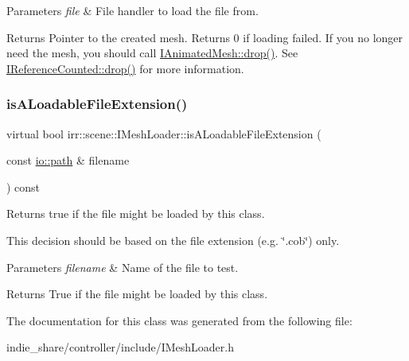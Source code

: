 \begin{DoxyParams}{Parameters}
{\em file} & File handler to load the file from. \\
\hline
\end{DoxyParams}
\begin{DoxyReturn}{Returns}
Pointer to the created mesh. Returns 0 if loading failed. If you no longer need the mesh, you should call \hyperlink{classirr_1_1IReferenceCounted_a03856a09355b89d178090c4a5f738543}{I\+Animated\+Mesh\+::drop()}. See \hyperlink{classirr_1_1IReferenceCounted_a03856a09355b89d178090c4a5f738543}{I\+Reference\+Counted\+::drop()} for more information. 
\end{DoxyReturn}
\mbox{\label{classirr_1_1scene_1_1IMeshLoader_a64bd3f1f17b4ff1f0f4f929c850614f3}} 
\subsubsection{\texorpdfstring{is\+A\+Loadable\+File\+Extension()}{isALoadableFileExtension()}}
{\footnotesize\ttfamily virtual bool irr\+::scene\+::\+I\+Mesh\+Loader\+::is\+A\+Loadable\+File\+Extension (\begin{DoxyParamCaption}\item[{const \hyperlink{namespaceirr_1_1io_ab1bdc45edb3f94d8319c02bc0f840ee1}{io\+::path} \&}]{filename }\end{DoxyParamCaption}) const\hspace{0.3cm}{\ttfamily [pure virtual]}}



Returns true if the file might be loaded by this class. 

This decision should be based on the file extension (e.\+g. \char`\"{}.\+cob\char`\"{}) only. 
\begin{DoxyParams}{Parameters}
{\em filename} & Name of the file to test. \\
\hline
\end{DoxyParams}
\begin{DoxyReturn}{Returns}
True if the file might be loaded by this class. 
\end{DoxyReturn}


The documentation for this class was generated from the following file\+:\begin{DoxyCompactItemize}
\item 
indie\+\_\+share/controller/include/I\+Mesh\+Loader.\+h\end{DoxyCompactItemize}
